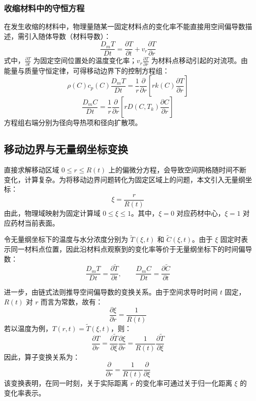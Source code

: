 \documentclass[withoutpreface,bwprint]{cumcm_thesis}
\begin{document}
\subsubsection{收缩材料中的守恒方程}

在发生收缩的材料中，物理量随某一固定材料点的变化率不能直接用空间偏导数描述，需引入随体导数（材料导数）：
\begin{equation}
\frac{D_m T}{Dt} = \frac{\partial T}{\partial t} + v_r \frac{\partial T}{\partial r}
\end{equation}
式中，\(\frac{\partial T}{\partial t}\) 为固定空间位置处的温度变化率；\(v_r \frac{\partial T}{\partial r}\) 为材料点移动引起的对流项。由能量与质量守恒定律，可得移动边界下的控制方程组：
\begin{equation}
\rho(C) c_p(C) \frac{D_m T}{Dt} = \frac{1}{r} \frac{\partial}{\partial r} \left[ r k(C) \frac{\partial T}{\partial r} \right]
\end{equation}
\begin{equation}
\frac{D_m C}{Dt} = \frac{1}{r} \frac{\partial}{\partial r} \left[ r D(C, T_k) \frac{\partial C}{\partial r} \right]
\end{equation}
方程组右端分别为径向导热项和径向扩散项。

\subsection{移动边界与无量纲坐标变换}

直接求解移动区域 \(0 \le r \le R(t)\) 上的偏微分方程，会导致空间网格随时间不断变化，计算复杂。为将移动边界问题转化为固定区域上的问题，本文引入无量纲坐标：
\begin{equation}
\xi = \frac{r}{R(t)}
\end{equation}
由此，物理域映射为固定计算域 \(0 \le \xi \le 1\)。其中，\(\xi=0\) 对应药材中心，\(\xi=1\) 对应药材当前表面。

令无量纲坐标下的温度与水分浓度分别为 \(\tilde{T}(\xi,t)\) 和 \(\tilde{C}(\xi,t)\)。由于 \(\xi\) 固定时表示同一材料点位置，因此沿材料点观察到的变化率等价于无量纲坐标下的时间偏导数：
\begin{equation}
\frac{D_m T}{Dt} = \frac{\partial \tilde{T}}{\partial t}, \qquad \frac{D_m C}{Dt} = \frac{\partial \tilde{C}}{\partial t}
\end{equation}

进一步，由链式法则推导空间偏导数的变换关系。由于空间求导时时间 \(t\) 固定，\(R(t)\) 对 \(r\) 而言为常数，故有：
\begin{equation}
\frac{\partial \xi}{\partial r} = \frac{1}{R(t)}
\end{equation}
若以温度为例，\(T(r,t) = \tilde{T}(\xi,t)\)，则：
\begin{equation}
\frac{\partial T}{\partial r} = \frac{\partial \tilde{T}}{\partial \xi} \frac{\partial \xi}{\partial r} = \frac{1}{R(t)} \frac{\partial \tilde{T}}{\partial \xi}
\end{equation}
因此，算子变换关系为：
\begin{equation}
\frac{\partial}{\partial r} = \frac{1}{R(t)} \frac{\partial}{\partial \xi}
\end{equation}
该变换表明，在同一时刻，关于实际距离 \(r\) 的变化率可通过关于归一化距离 \(\xi\) 的变化率表示。
\end{document}
